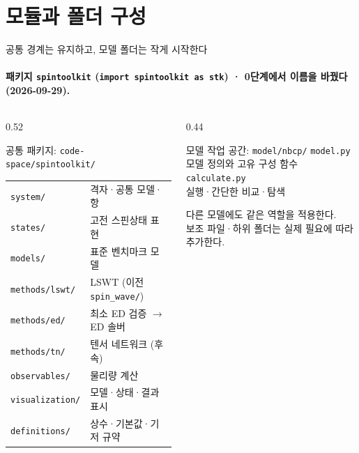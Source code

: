 \section[모듈과 폴더 구성]{모듈과 폴더 구성}

\begin{frame}[plain,label=section-modules]
  \sectionpage
\end{frame}

\begin{frame}[label=folder-plan]{공통 경계는 유지하고, 모델 폴더는 작게 시작한다}
  \framesubtitle{패키지 \texttt{spintoolkit} (\texttt{import spintoolkit as stk}) · 0단계에서 이름을 바꿨다(2026-09-29).}
  \begin{columns}[T,onlytextwidth]
    \begin{column}{0.52\textwidth}
      \begin{block}{공통 패키지: \texttt{code-space/spintoolkit/}}
        \small
        \begin{tabular}{@{}ll@{}}
          \texttt{system/} & 격자·공통 모델·항 \\
          \texttt{states/} & 고전 스핀상태 표현 \\
          \texttt{models/} & 표준 벤치마크 모델 \\
          \texttt{methods/lswt/} & LSWT (이전 \texttt{spin\_wave/}) \\
          \texttt{methods/ed/} & 최소 ED 검증 $\to$ ED 솔버 \\
          \texttt{methods/tn/} & 텐서 네트워크 (후속) \\
          \texttt{observables/} & 물리량 계산 \\
          \texttt{visualization/} & 모델·상태·결과 표시 \\
          \texttt{definitions/} & 상수·기본값·기저 규약
        \end{tabular}
      \end{block}
    \end{column}
    \begin{column}{0.44\textwidth}
      \begin{block}{모델 작업 공간: \texttt{model/nbcp/}}
        \texttt{model.py}\\
        모델 정의와 고유 구성 함수\\[0.8em]
        \texttt{calculate.py}\\
        실행·간단한 비교·탐색
      \end{block}
      \smallskip
      다른 모델에도 같은 역할을 적용한다.\\
      보조 파일·하위 폴더는 실제 필요에 따라 추가한다.
    \end{column}
  \end{columns}
  \smallskip
\end{frame}


